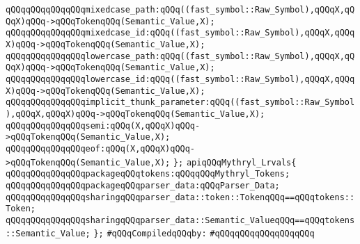 \verb|qQQqqQQqqQQqqQQqmixedcase_path:qQQq((fast_symbol::Raw_Symbol),qQQqX,qQQqX)qQQq->qQQqTokenqQQq(Semantic_Value,X);|\newline
\verb|qQQqqQQqqQQqqQQqmixedcase_id:qQQq((fast_symbol::Raw_Symbol),qQQqX,qQQqX)qQQq->qQQqTokenqQQq(Semantic_Value,X);|\newline
\verb|qQQqqQQqqQQqqQQqlowercase_path:qQQq((fast_symbol::Raw_Symbol),qQQqX,qQQqX)qQQq->qQQqTokenqQQq(Semantic_Value,X);|\newline
\verb|qQQqqQQqqQQqqQQqlowercase_id:qQQq((fast_symbol::Raw_Symbol),qQQqX,qQQqX)qQQq->qQQqTokenqQQq(Semantic_Value,X);|\newline
\verb|qQQqqQQqqQQqqQQqimplicit_thunk_parameter:qQQq((fast_symbol::Raw_Symbol),qQQqX,qQQqX)qQQq->qQQqTokenqQQq(Semantic_Value,X);|\newline
\verb|qQQqqQQqqQQqqQQqsemi:qQQq(X,qQQqX)qQQq->qQQqTokenqQQq(Semantic_Value,X);|\newline
\verb|qQQqqQQqqQQqqQQqeof:qQQq(X,qQQqX)qQQq->qQQqTokenqQQq(Semantic_Value,X);|\newline
\verb|};|\newline
\verb|apiqQQqMythryl_Lrvals{|\newline
\verb|qQQqqQQqqQQqqQQqpackageqQQqtokens:qQQqqQQqMythryl_Tokens;|\newline
\verb|qQQqqQQqqQQqqQQqpackageqQQqparser_data:qQQqParser_Data;|\newline
\verb|qQQqqQQqqQQqqQQqsharingqQQqparser_data::token::TokenqQQq==qQQqtokens::Token;|\newline
\verb|qQQqqQQqqQQqqQQqsharingqQQqparser_data::Semantic_ValueqQQq==qQQqtokens::Semantic_Value;|\newline
\verb|};|\newline
\newline
\verb|#qQQqCompiledqQQqby:|\newline
\verb|#qQQqqQQqqQQqqQQqqQQq|\newline
\newline

